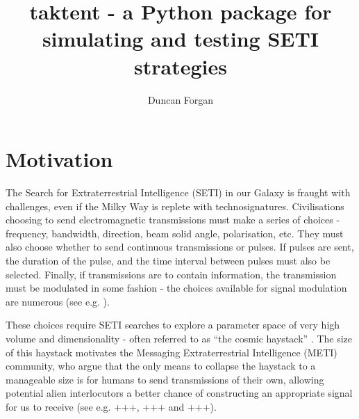 \documentclass[RNAAS]{aastex62}
\begin{document}
\title{taktent - a Python package for simulating and testing SETI strategies}


\author[0000-0003-1175-4388]{Duncan Forgan}


\keywords{}


\section{Motivation}

The Search for Extraterrestrial Intelligence (SETI) in our Galaxy is fraught with challenges, even if the Milky Way is replete with technosignatures.  Civilisations choosing to send electromagnetic transmissions must make a series of choices - frequency, bandwidth, direction, beam solid angle, polarisation, etc.  They must also choose whether to send continuous transmissions or pulses.  If pulses are sent, the duration of the pulse, and the time interval between pulses must also be selected.  Finally, if transmissions are to contain information, the transmission must be modulated in some fashion - the choices available for signal modulation are numerous (see e.g. \citealt{Messerschmitt2013,Messerschmitt2015}).  

These choices require SETI searches to explore a parameter space of very high volume and dimensionality - often referred to as ``the cosmic haystack'' \citep{TarterPlanetsLife2007,Wright2018a}.  The size of this haystack motivates the Messaging Extraterrestrial Intelligence (METI) community, who argue that the only means to collapse the haystack to a manageable size is for humans to send transmissions of their own, allowing potential alien interlocutors a better chance of constructing an appropriate signal for us to receive (see e.g. +++, +++ and +++).
\end{document}
